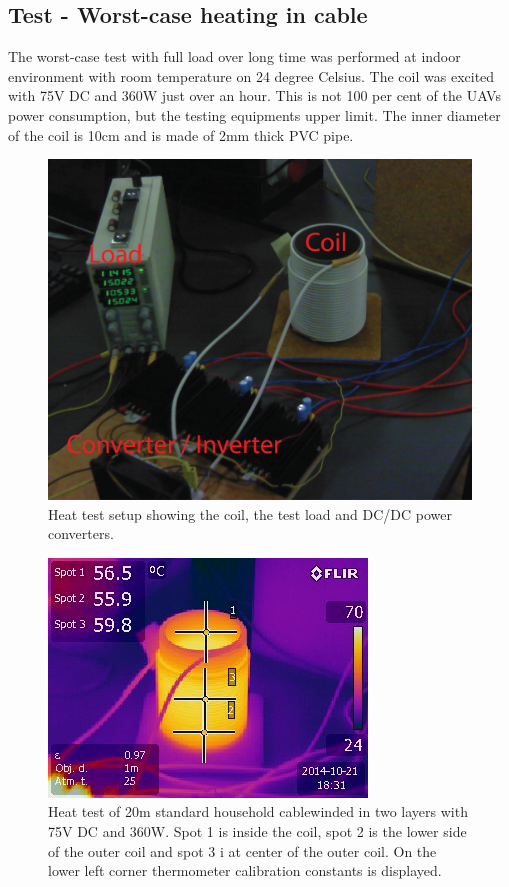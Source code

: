 \subsection{Test - Worst-case heating in cable}
The worst-case test with full load over long time was performed at indoor environment with room temperature on 24 degree Celsius. The coil was excited with 75V DC and 360W just over an hour. This is not 100 per cent of the UAVs power consumption, but the testing equipments upper limit. The inner diameter of the coil is 10cm and is made of 2mm thick PVC pipe.


\begin{figure}[H]
   \centering
   \includegraphics[scale=0.5]{graphics/heat_test/heat_test_setup.png}
   \caption{Heat test setup showing the coil, the test load and DC/DC power converters.}
   \end{figure}
      

\begin{figure}[H]
\centering
\includegraphics[scale=1]{graphics/heat_test/IR_1491.jpg}
\caption[Heat test, image from thermal camera]{Heat test of 20m standard household cable\footnotemark winded in two layers with 75V DC and 360W. Spot 1 is inside the coil, spot 2 is the lower side of the outer coil and spot 3 i at center of the outer coil. On the lower left corner thermometer calibration constants is displayed.}
\label{fig:heat_test_ir}
\end{figure}

